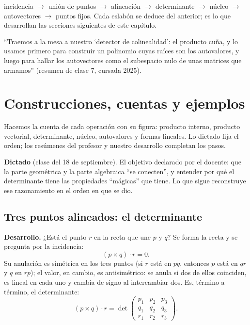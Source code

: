 \begin{idea}[La cadena]
incidencia \(\to\) unión de puntos \(\to\) alineación \(\to\) determinante \(\to\)
núcleo \(\to\) autovectores \(\to\) puntos fijos. Cada eslabón se deduce del anterior;
es lo que desarrollan las secciones siguientes de este capítulo.
\end{idea}

\begin{idea}
``Traemos a la mesa a nuestro `detector de colinealidad': el producto cuña, y lo usamos
primero para construir un polinomio cuyas raíces son los autovalores, y luego para hallar
los autovectores como el subespacio nulo de unas matrices que armamos'' (resumen de clase 7, cursada 2025).
\end{idea}

\section{Construcciones, cuentas y ejemplos}


Hacemos la cuenta de cada operación con su figura: producto interno, producto vectorial, determinante, núcleo, autovalores y formas lineales. Lo dictado fija el orden; los resúmenes del profesor y nuestro desarrollo completan los pasos.

\textbf{Dictado} (clase del 18 de septiembre). El objetivo declarado por el docente: que la
parte geométrica y la parte algebraica ``se conecten'', y entender por qué el determinante
tiene las propiedades ``mágicas'' que tiene. Lo que sigue reconstruye ese razonamiento en el
orden en que se dio.

\subsection{Tres puntos alineados: el determinante}\label{sec:determinante}

{\small\vspace{1mm}\par}


\textbf{Desarrollo.} ¿Está el punto \(r\) en la recta que une \(p\) y \(q\)? Se forma la
recta y se pregunta por la incidencia:
\[
  (p\times q)\cdot r=0 .
\]
Su anulación es simétrica en los tres puntos (si \(r\) está en \(pq\), entonces \(p\) está
en \(qr\) y \(q\) en \(rp\)); el valor, en cambio, es antisimétrico: se anula si dos de
ellos coinciden, es lineal en cada uno y cambia de signo al intercambiar dos. Es, término a término, el determinante:
\[
  (p\times q)\cdot r=\det\begin{pmatrix}p_1&p_2&p_3\\q_1&q_2&q_3\\r_1&r_2&r_3\end{pmatrix}.
\]

